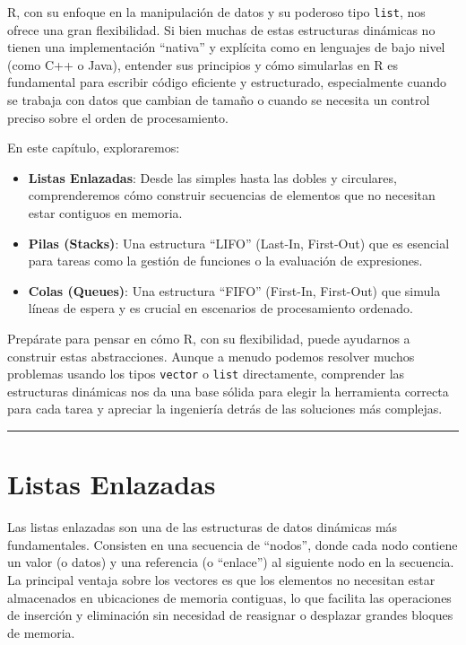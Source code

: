 \documentclass[
  spanish,
  letterpaper,
  DIV=11,
  numbers=noendperiod]{scrreprt}
\providecommand{\tightlist}{%
  \setlength{\itemsep}{0pt}\setlength{\parskip}{0pt}}
\begin{document}
R, con su enfoque en la manipulación de datos y su poderoso tipo
\texttt{list}, nos ofrece una gran flexibilidad. Si bien muchas de estas
estructuras dinámicas no tienen una implementación ``nativa'' y
explícita como en lenguajes de bajo nivel (como C++ o Java), entender
sus principios y cómo simularlas en R es fundamental para escribir
código eficiente y estructurado, especialmente cuando se trabaja con
datos que cambian de tamaño o cuando se necesita un control preciso
sobre el orden de procesamiento.

En este capítulo, exploraremos:

\begin{itemize}
\tightlist
\item
  \textbf{Listas Enlazadas}: Desde las simples hasta las dobles y
  circulares, comprenderemos cómo construir secuencias de elementos que
  no necesitan estar contiguos en memoria.
\item
  \textbf{Pilas (Stacks)}: Una estructura ``LIFO'' (Last-In, First-Out)
  que es esencial para tareas como la gestión de funciones o la
  evaluación de expresiones.
\item
  \textbf{Colas (Queues)}: Una estructura ``FIFO'' (First-In, First-Out)
  que simula líneas de espera y es crucial en escenarios de
  procesamiento ordenado.
\end{itemize}

Prepárate para pensar en cómo R, con su flexibilidad, puede ayudarnos a
construir estas abstracciones. Aunque a menudo podemos resolver muchos
problemas usando los tipos \texttt{vector} o \texttt{list} directamente,
comprender las estructuras dinámicas nos da una base sólida para elegir
la herramienta correcta para cada tarea y apreciar la ingeniería detrás
de las soluciones más complejas.

\begin{center}\rule{0.5\linewidth}{0.5pt}\end{center}


\chapter{Listas Enlazadas}\label{listas-enlazadas}

Las listas enlazadas son una de las estructuras de datos dinámicas más
fundamentales. Consisten en una secuencia de ``nodos'', donde cada nodo
contiene un valor (o datos) y una referencia (o ``enlace'') al siguiente
nodo en la secuencia. La principal ventaja sobre los vectores es que los
elementos no necesitan estar almacenados en ubicaciones de memoria
contiguas, lo que facilita las operaciones de inserción y eliminación
sin necesidad de reasignar o desplazar grandes bloques de memoria.
\end{document}
